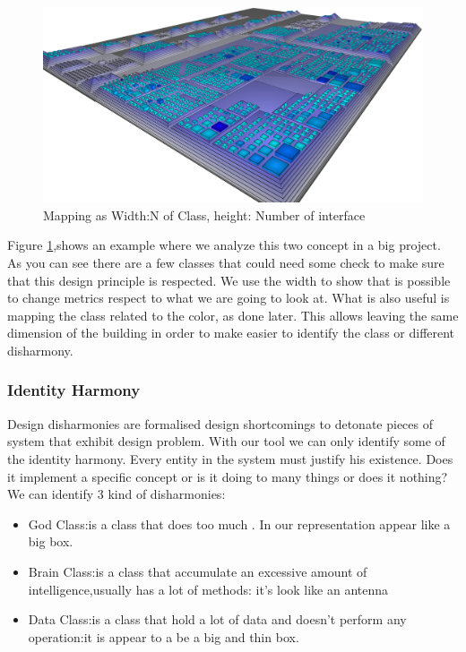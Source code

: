 \documentclass[]{usiinfbachelorproject}
\begin{document}
\begin{figure}[H]
\centering
\includegraphics[width=.60\textwidth]{images/ClassesAndInterfaces}
\caption[Classes and Interfaces Mapping]{Mapping as Width:N of Class, height: Number of interface \label{fig:classInterface}
}
	
\end{figure}

Figure \ref{fig:classInterface},shows an example where we analyze this two concept in a big project. As you can see there are a few classes that could need some check to make sure that this design principle is respected. We use the width to show that is possible to change metrics respect to what we are going to look at. What is also useful is mapping the class related to the color, as done later. This allows leaving the same dimension of the building in order to make easier to identify the class or different disharmony.



\subsubsection{Identity Harmony	}\label{sec:idHarmony}
Design disharmonies are formalised design shortcomings to detonate pieces of system that exhibit design problem. With our tool we can only identify some of the identity harmony. Every entity in the system must justify his existence. Does it implement a specific concept or is it doing to many things or does  it nothing?\\

We can identify 3 kind of disharmonies:
\begin{itemize}

\item{God Class}:is a class that does too much . In our representation appear like a big box.
\item{Brain Class}:is a class that accumulate an excessive amount of intelligence,usually has a lot of methods: it's look like an antenna
\item{Data Class}:is a class that hold a lot of data and doesn't perform any operation:it is appear to a be a big and thin box.

\end{itemize} 
\end{document}
